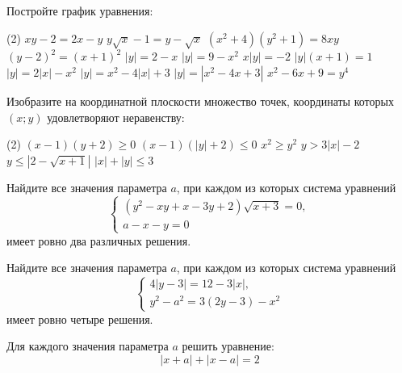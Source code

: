 %
%

\begin{class}[number=1]
	\begin{listofex}
		\item Постройте график уравнения:
		\begin{tasks}(2)
			\task \( xy-2=2x-y \)
			\task \( y\sqrt{x}-1=y-\sqrt{x} \)
			\task \( (x^2+4)(y^2+1)=8xy \)
			\task \( (y-2)^2=(x+1)^2 \)
			\task \( |y|=2-x \)
			\task \( |y|=9-x^2 \)
			\task \( x|y|=-2 \)
			\task \( |y|(x+1)=1 \)
			\task \( |y|=2|x|-x^2 \)
			\task \( |y|=x^2-4|x|+3 \)
			\task \( |y|=|x^2-4x+3| \)
			\task \( x^2-6x+9=y^4 \)
		\end{tasks}
		\item Изобразите на координатной плоскости множество точек, координаты которых \( (x; y) \) удовлетворяют неравенству:
		\begin{tasks}(2)
			\task \( (x-1)(y+2)\ge0 \)
			\task \( (x-1)(|y|+2)\le0 \)
			\task \( x^2\ge y^2 \)
			\task \( y>3|x|-2 \)
			\task \( y\le|2-\sqrt{x+1}| \)
			\task \( |x|+|y|\le3 \)
		\end{tasks}
		\item Найдите все значения параметра \( a \), при каждом из которых система уравнений
		\[ \left\{
		\begin{array}{l}
			(y^2-xy+x-3y+2)\sqrt{x+3}=0,\\
			a-x-y=0
		\end{array}
		\right. \]
		имеет ровно два различных решения.
		\item Найдите все значения параметра \( a \), при каждом из которых система уравнений
		\[ \left\{
		\begin{array}{l}
			4|y-3|=12-3|x|,\\
			y^2-a^2=3(2y-3)-x^2
		\end{array}
		\right. \]
		имеет ровно четыре решения.
		\item Для каждого значения параметра \( a \) решить уравнение:
		\[ |x+a|+|x-a|=2 \]
	\end{listofex}
\end{class}

